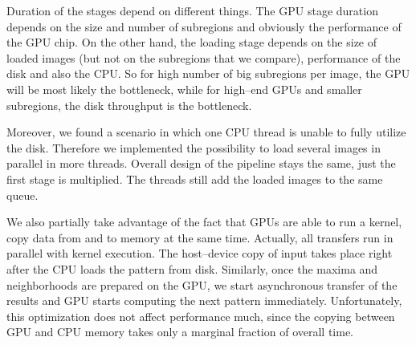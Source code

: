Duration of the stages depend on different things. The GPU stage duration depends on the size and number of subregions and obviously the performance of the GPU chip. On the other hand, the loading stage depends on the size of loaded images (but not on the subregions that we compare), performance of the disk and also the CPU. So for high number of big subregions per image, the GPU will be most likely the bottleneck, while for high--end GPUs and smaller subregions, the disk throughput is the bottleneck. 

Moreover, we found a scenario in which one CPU thread is unable to fully utilize the disk. Therefore we implemented the possibility to load several images in parallel in more threads. Overall design of the pipeline stays the same, just the first stage is multiplied. The threads still add the loaded images to the same queue.

We also partially take advantage of the fact that GPUs are able to run a kernel, copy data from and to memory at the same time. Actually, all transfers run in parallel with kernel execution. The host--device copy of input takes place right after the CPU loads the pattern from disk. Similarly, once the maxima and neighborhoods are prepared on the GPU, we start asynchronous transfer of the results and GPU starts computing the next pattern immediately. Unfortunately, this optimization does not affect performance much, since the copying between GPU and CPU memory takes only a marginal fraction of overall time.






